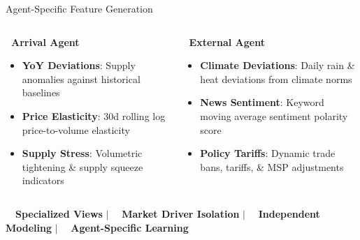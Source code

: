 \documentclass{beamer}
\begin{document}
\begin{frame}{Agent-Specific Feature Generation}
\begin{columns}[T]
    \begin{smallcard}[0.98\textwidth, top=1.5pt, bottom=1.5pt, left=3pt, right=3pt, boxsep=0.5pt]
        \centering
        \textbf{\textcolor{accentTeal}{\small {}~Arrival Agent}}
        \vspace{0.05cm}
        \begin{itemize}\setlength\itemsep{1pt}\setlength\parskip{0pt}
            \tiny
            \item \textbf{YoY Deviations}: Supply anomalies against historical baselines
            \item \textbf{Price Elasticity}: 30d rolling log price-to-volume elasticity
            \item \textbf{Supply Stress}: Volumetric tightening \& supply squeeze indicators
        \end{itemize}
    \end{smallcard}

    \begin{smallcard}[0.98\textwidth, top=1.5pt, bottom=1.5pt, left=3pt, right=3pt, boxsep=0.5pt]
        \centering
        \textbf{\textcolor{accentTeal}{\small {}~External Agent}}
        \vspace{0.05cm}
        \begin{itemize}\setlength\itemsep{1pt}\setlength\parskip{0pt}
            \tiny
            \item \textbf{Climate Deviations}: Daily rain \& heat deviations from climate norms
            \item \textbf{News Sentiment}: Keyword moving average sentiment polarity score
            \item \textbf{Policy Tariffs}: Dynamic trade bans, tariffs, \& MSP adjustments
        \end{itemize}
    \end{smallcard}
\end{columns}

\vspace{0.06cm}

\begin{tcolorbox}[enhanced, colback=primaryblue!4, colframe=primaryblue!30, boxrule=0.35pt,
  arc=3.5pt, width=0.98\textwidth, left=4pt, right=4pt, top=2.5pt, bottom=2.5pt, boxsep=0pt,
  halign=center, shadow={0.5pt}{-0.5pt}{0pt}{black!8}]
    \fontsize{5.5pt}{6.5pt}\selectfont
    \textcolor{primaryDark}{~~\textbf{Specialized Views} \quad $\vert$ \quad {}~~\textbf{Market Driver Isolation} \quad $\vert$ \quad {}~~\textbf{Independent Modeling} \quad $\vert$ \quad {}~~\textbf{Agent-Specific Learning}}
\end{tcolorbox}
\end{frame}
\end{document}
